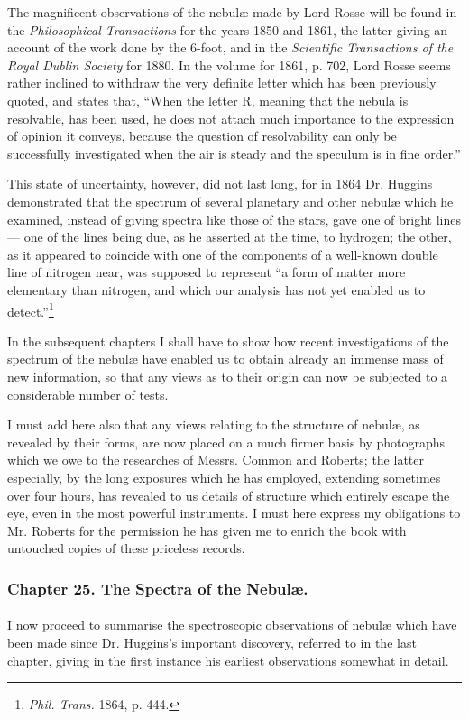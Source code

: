 \documentclass[a4paper, 12pt, oneside, polutonikogreek, english]{article}
\begin{document}
The magnificent observations of the nebulæ made by Lord Rosse will be found in the \emph{Philosophical Transactions} for the years 1850 and 1861, the latter giving an account of the work done by the 6-foot, and in the \emph{Scientific Transactions of the Royal Dublin Society} for 1880. In the volume for 1861, p. 702, Lord Rosse seems rather inclined to withdraw the very definite letter which has been previously quoted, and states that, ``When the letter R, meaning that the nebula is resolvable, has been used, he does not attach much importance to the expression of opinion it conveys, because the question of resolvability can only be successfully investigated when the air is steady and the speculum is in fine order.''

This state of uncertainty, however, did not last long, for in 1864 Dr. Huggins demonstrated that the spectrum of several planetary and other nebulæ which he examined, instead of giving spectra like those of the stars, gave one of bright lines --- one of the lines being due, as he asserted at the time, to hydrogen; the other, as it appeared to coincide with one of the components of a well-known double line of nitrogen near, was supposed to represent ``a form of matter more elementary than nitrogen, and which our analysis has not yet enabled us to detect.''\footnote{\emph{Phil. Trans.} 1864, p. 444.}

In the subsequent chapters I shall have to show how recent investigations of the spectrum of the nebulæ have enabled us to obtain already an immense mass of new information, so that any views as to their origin can now be subjected to a considerable number of tests.

I must add here also that any views relating to the structure of nebulæ, as revealed by their forms, are now placed on a much firmer basis by photographs which we owe to the researches of Messrs. Common and Roberts; the latter especially, by the long exposures which he has employed, extending sometimes over four hours, has revealed to us details of structure which entirely escape the eye, even in the most powerful instruments. I must here express my obligations to Mr. Roberts for the permission he has given me to enrich the book with untouched copies of these priceless records.
\clearpage
\subsubsection{Chapter 25. The Spectra of the Nebulæ.}
\paragraph{}
I now proceed to summarise the spectroscopic observations of nebulæ which have been made since Dr. Huggins's important discovery, referred to in the last chapter, giving in the first instance his earliest observations somewhat in detail.
\end{document}

